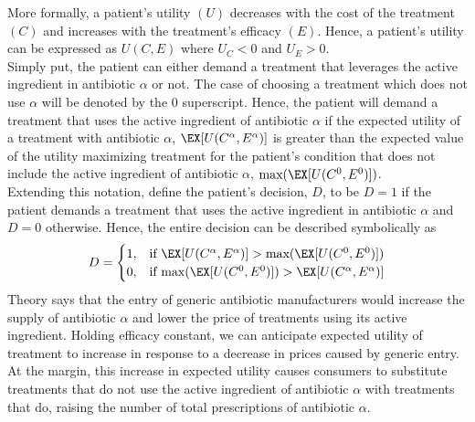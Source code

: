 \indent More formally, a patient's utility $(U)$ decreases with the cost of the treatment $(C)$ and increases with the treatment's efficacy $(E)$. Hence, a patient's utility can be expressed as $U(C,E)$ where $U_C < 0$ and $U_E > 0$.\\
\indent Simply put, the patient can either demand a treatment that leverages the active ingredient in antibiotic $\alpha$ or not. The case of choosing a treatment which does not use $\alpha$ will be denoted by the $0$ superscript. Hence, the patient will demand a treatment that uses the active ingredient of antibiotic $\alpha$ if the expected utility of a treatment with antibiotic $\alpha$, $\EX[U(C^\alpha,E^\alpha)]$ is greater than the expected value of the utility maximizing treatment for the patient's condition that does not include the active ingredient of antibiotic $\alpha$, $\text{max}(\EX[U(C^0,E^0)])$.\\
Extending this notation, define the patient's decision, $D$, to be $D=1$ if the patient demands a treatment that uses the active ingredient in antibiotic $\alpha$ and $D=0$ otherwise. Hence, the entire decision can be described symbolically as
\begin{eqnarray}
  D =
  \begin{cases}
    1, & \text{if }\EX[U(C^\alpha,E^\alpha)] > \text{max}(\EX[U(C^0,E^0)]) \\
    0, & \text{if }\text{max}(\EX[U(C^0,E^0)]) > \EX[U(C^\alpha,E^\alpha)] \\
  \end{cases}
\end{eqnarray}
\indent Theory says that the entry of generic antibiotic manufacturers would increase the supply of antibiotic $\alpha$ and lower the price of treatments using its active ingredient. Holding efficacy constant, we can anticipate expected utility of treatment to increase in response to a decrease in prices caused by generic entry. At the margin, this increase in expected utility causes consumers to substitute treatments that do not use the active ingredient of antibiotic $\alpha$ with treatments that do, raising the number of total prescriptions of antibiotic $\alpha$.
